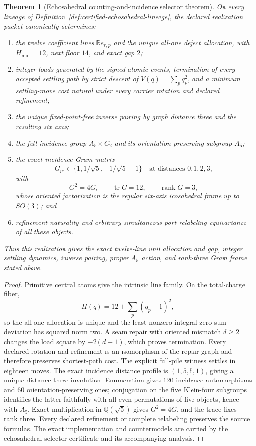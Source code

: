 \documentclass[11pt]{article}
\newtheorem{theorem}{Theorem}[section]
\theoremstyle{remark}
\theoremstyle{plain}
\begin{document}
\begin{theorem}[Echosahedral counting-and-incidence selector theorem]
\label{thm:echosahedral-source-selector-microphysics}
On every lineage of
Definition~\ref{def:certified-echosahedral-lineage}, the declared realization packet
canonically determines:
\begin{enumerate}[leftmargin=2em,label=\textup{(\roman*)}]
\item the twelve coefficient lines \(\mathbb R e_{r,p}\) and the unique
all-one defect allocation, with \(H_{\min}=12\), next floor \(14\), and exact
gap \(2\);
\item integer loads generated by the signed atomic events, termination of
every accepted settling path by strict descent of
\(V(q)=\sum_pq_p^2\), and a minimum settling-move cost natural under every
carrier rotation and declared refinement;
\item the unique fixed-point-free inverse pairing by graph distance three and
the resulting six axes;
\item the full incidence group \(A_5\times C_2\) and its
orientation-preserving subgroup \(A_5\);
\item the exact incidence Gram matrix
\[
G_{pq}\in\{1,1/\sqrt5,-1/\sqrt5,-1\}
\quad\text{at distances }0,1,2,3,
\]
with
\[
G^2=4G,\qquad \operatorname{tr}G=12,\qquad \operatorname{rank}G=3,
\]
whose oriented factorization is the regular six-axis icosahedral frame up to
\(SO(3)\); and
\item refinement naturality and arbitrary simultaneous port-relabeling
equivariance of all these objects.
\end{enumerate}
Thus this realization gives the exact twelve-line unit allocation and gap,
integer settling dynamics, inverse pairing, proper \(A_5\) action, and
rank-three Gram frame stated above.
\end{theorem}

\begin{proof}
Primitive central atoms give the intrinsic line family.  On the total-charge
fiber,
\[
H(q)=12+\sum_p(q_p-1)^2,
\]
so the all-one allocation is unique and the least nonzero integral zero-sum
deviation has squared norm two. A seam repair with oriented mismatch
\(d\geq2\) changes the load square by \(-2(d-1)\), which proves termination.
Every declared rotation and refinement is an isomorphism of the repair graph
and therefore preserves shortest-path cost. The explicit full-pile witness
settles in eighteen moves. The exact incidence distance profile is
\((1,5,5,1)\), giving a unique distance-three involution.  Enumeration gives
\(120\) incidence automorphisms and \(60\) orientation-preserving ones;
conjugation on the five Klein-four subgroups identifies the latter faithfully
with all even permutations of five objects, hence with \(A_5\).  Exact
multiplication in \(\mathbb Q(\sqrt5)\) gives \(G^2=4G\), and the trace fixes
rank three.  Every declared refinement or complete relabeling preserves the
source formulas.  The exact implementation and countermodels are carried by the echosahedral
selector certificate and its accompanying analysis.
\end{proof}
\end{document}
